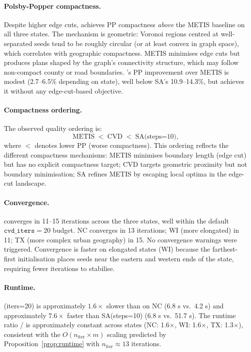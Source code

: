 \paragraph{Polsby-Popper compactness.}
Despite higher edge cuts, \cvd{} achieves PP compactness \emph{above}
the METIS baseline on all three states.
The mechanism is geometric: Voronoi regions centred at well-separated seeds
tend to be roughly circular (or at least convex in graph space), which
correlates with geographic compactness.
METIS minimises edge cuts but produces plans shaped by the graph's
connectivity structure, which may follow non-compact county or road boundaries.
\cvd{}'s PP improvement over METIS is modest (2.7--6.5\% depending on state),
well below SA's 10.9--14.3\%, but \cvd{} achieves it without any
edge-cut-based objective.

\paragraph{Compactness ordering.}
The observed quality ordering is:
\[
  \text{METIS} \;<\; \text{CVD} \;<\; \text{SA(steps=10)},
\]
where $<$ denotes lower PP (worse compactness).
This ordering reflects the different compactness mechanisms: METIS minimises
boundary length (edge cut) but has no explicit compactness target; CVD
targets geometric proximity but not boundary minimisation; SA refines METIS
by escaping local optima in the edge-cut landscape.

\paragraph{Convergence.}
\cvd{} converges in 11--15 iterations across the three states, well within the
default $\mathtt{cvd\_iters} = 20$ budget.
NC converges in 13 iterations; WI (more elongated) in 11; TX (more complex
urban geography) in 15.
No convergence warnings were triggered.
Convergence is faster on elongated states (WI) because the farthest-first
initialisation places seeds near the eastern and western ends of the state,
requiring fewer iterations to stabilise.

\paragraph{Runtime.}
\cvd{}(iters=20) is approximately $1.6\times$ slower than \metis{} on NC
(6.8 s vs.\ 4.2 s) and approximately $7.6\times$ faster than SA(steps=10)
(6.8 s vs.\ 51.7 s).
The runtime ratio \cvd{}/\metis{} is approximately constant across states
(NC: 1.6$\times$, WI: 1.6$\times$, TX: 1.3$\times$), consistent with
the $O(n_{\mathrm{iter}} \times m)$ scaling predicted by
Proposition~\ref{prop:runtime} with $n_{\mathrm{iter}} \approx 13$ iterations.

